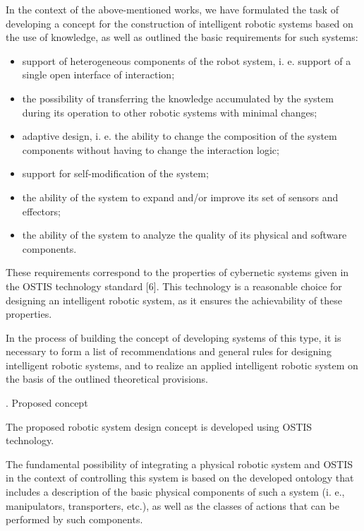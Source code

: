 \documentclass[10pt, letterpaper, twoside]{article}
\begin{document}
\setcounter{page}{96}
\begin{multicols}{2}
In the context of the above-mentioned works, we
have formulated the task of developing a concept for
the construction of intelligent robotic systems based on
the use of knowledge, as well as outlined the basic
requirements for such systems:
\begin{itemize}[noitemsep]
   

\item  support of heterogeneous components of the robot
system, i. e. support of a single open interface of
interaction;

\item the possibility of transferring the knowledge accumulated
by the system during its operation to other
robotic systems with minimal changes;

\item adaptive design, i. e. the ability to change the composition
of the system components without having
to change the interaction logic;

\item support for self-modification of the system;
\item the ability of the system to expand and/or improve
its set of sensors and effectors;

\item the ability of the system to analyze the quality of
its physical and software components.

 \end{itemize}
These requirements correspond to the properties of
cybernetic systems given in the OSTIS technology standard
[6]. This technology is a reasonable choice for
designing an intelligent robotic system, as it ensures the
achievability of these properties.

In the process of building the concept of developing
systems of this type, it is necessary to form a list of
recommendations and general rules for designing intelligent
robotic systems, and to realize an applied intelligent
robotic system on the basis of the outlined theoretical
provisions.

\begin{center}
\MakeUppercase{}. Proposed concept
\end{center}

The proposed robotic system design concept is developed
using OSTIS technology.

The fundamental possibility of integrating a physical
robotic system and OSTIS in the context of controlling
this system is based on the developed ontology that
includes a description of the basic physical components
of such a system (i. e., manipulators, transporters, etc.),
as well as the classes of actions that can be performed
by such components.


\end{multicols}
\end{document}
